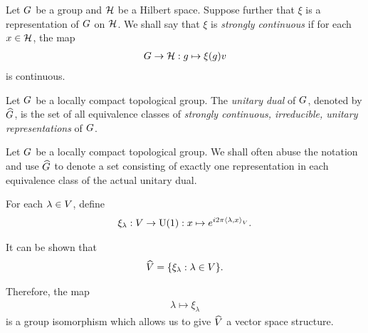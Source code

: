 \begin{definition}
\label{definition:strongly_continuous_representation}
    Let $G$ be a group and $\mathcal{H}$ be a Hilbert space.
    Suppose further that $\xi$ is a representation of $G$ on $\mathcal{H}$.
    We shall say that $\xi$ is \emph{strongly continuous}
    if for each $x \in \mathcal{H}$,
    the map
    \begin{align*}
        G \to \mathcal{H} : g \mapsto \xi(g) v
    \end{align*}
    is continuous.
\end{definition}

\begin{definition}
\label{definition:unitary_dual}
    Let $G$ be a locally compact topological group.
    The \emph{unitary dual} of $G$, denoted by ${\widehat{G}}$,
    is the set of all equivalence classes of
    \emph{strongly continuous, irreducible, unitary representations} of $G$.
\end{definition}

\begin{remark}
    Let $G$ be a locally compact topological group.
    We shall often abuse the notation and use ${\widehat{G}}$ to denote a set consisting of
    exactly one representation in each equivalence class of the actual unitary dual.
\end{remark}

\begin{example}[$\dualGroup\VectorSpace$]
    For each $\lambda \in V$,
    define
    \begin{align}
        \xi_\lambda : V \to {\mathrm{U} (1)} : x \mapsto e^{i 2 \pi {{\langle \lambda, x \rangle}_{V}}}.
        \label{eq:elements_of_dual_of_vector_space}
    \end{align}

    It can be shown that
    \begin{align*}
        {\widehat{V}} = \{ \xi_\lambda : \lambda \in V \}.
    \end{align*}

    Therefore, the map
    \begin{align}
        \lambda \mapsto \xi_\lambda
        \label{eq:isomorphism_between_vector_space_and_its_dual_group}
    \end{align}
    is a group isomorphism which allows us to give $\dualGroup\VectorSpace$ a vector space structure.
\end{example}

